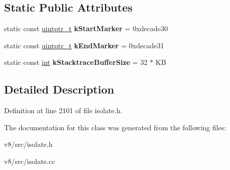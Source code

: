 \subsection*{Static Public Attributes}
\begin{DoxyCompactItemize}
\item 
\mbox{\label{classv8_1_1internal_1_1StackTraceFailureMessage_acc1cf61939387a952289004f2c697949}} 
static const \mbox{\hyperlink{classuintptr__t}{uintptr\+\_\+t}} {\bfseries k\+Start\+Marker} = 0xdecade30
\item 
\mbox{\label{classv8_1_1internal_1_1StackTraceFailureMessage_add9832cd69a261529150a25011fe4314}} 
static const \mbox{\hyperlink{classuintptr__t}{uintptr\+\_\+t}} {\bfseries k\+End\+Marker} = 0xdecade31
\item 
\mbox{\label{classv8_1_1internal_1_1StackTraceFailureMessage_a5ab25bd06c0fcffec5fccbd3fb3b1e55}} 
static const \mbox{\hyperlink{classint}{int}} {\bfseries k\+Stacktrace\+Buffer\+Size} = 32 $\ast$ KB
\end{DoxyCompactItemize}


\subsection{Detailed Description}


Definition at line 2101 of file isolate.\+h.



The documentation for this class was generated from the following files\+:\begin{DoxyCompactItemize}
\item 
v8/src/isolate.\+h\item 
v8/src/isolate.\+cc\end{DoxyCompactItemize}
